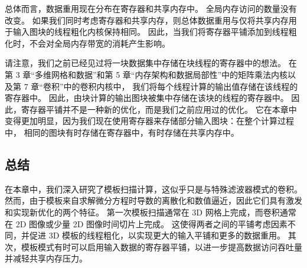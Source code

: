 总体而言，数据重用现在分布在寄存器和共享内存中。 全局内存访问的数量没有改变。 
如果我们同时考虑寄存器和共享内存，则总体数据重用与仅将共享内存用于输入图块的线程粗化内核保持相同。 
因此，当我们将寄存器平铺添加到线程粗化时，不会对全局内存带宽的消耗产生影响。

请注意，我们之前已经见过将一块数据集中存储在块线程的寄存器中的想法。 
在第 3 章“多维网格和数据”和第 5 章“内存架构和数据局部性”中的矩阵乘法内核以及第 7 章“卷积”中的卷积内核中，
我们将每个线程计算的输出值存储在该线程的寄存器中。 因此，由块计算的输出图块被集中存储在该块的线程的寄存器中。 
因此，寄存器平铺并不是一种新的优化，而是我们之前应用过的优化。 
它在本章中变得更加明显，因为我们现在使用寄存器来存储部分输入图块：在整个计算过程中，
相同的图块有时存储在寄存器中，有时存储在共享内存中。

\subsection{总结}
在本章中，我们深入研究了模板扫描计算，这似乎只是与特殊滤波器模式的卷积。 
然而，由于模板来自求解微分方程时导数的离散化和数值逼近，因此它们具有激发和实现新优化的两个特征。 
第一次模板扫描通常在 3D 网格上完成，而卷积通常在 2D 图像或少量 2D 图像时间切片上完成。 
这使得两者之间的平铺考虑因素不同，并促进 3D 模板的线程粗化，以实现更大的输入平铺和更多的数据重用。 
其次，模板模式有时可以启用输入数据的寄存器平铺，以进一步提高数据访问吞吐量并减轻共享内存压力。